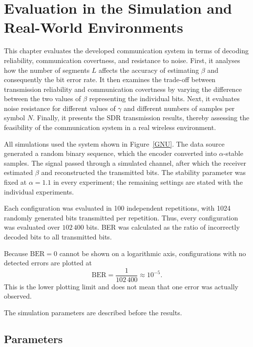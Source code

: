 \documentclass[a4paper, 12pt, openany]{book}
\begin{document}
\chapter{Evaluation in the Simulation and Real-World Environments}

This chapter evaluates the developed communication system in terms of decoding reliability, communication covertness, and resistance to noise. First, it analyses how the number of segments $L$ affects the accuracy of estimating $\beta$ and consequently the bit error rate. It then examines the trade-off between transmission reliability and communication covertness by varying the difference between the two values of $\beta$ representing the individual bits. Next, it evaluates noise resistance for different values of $\gamma$ and different numbers of samples per symbol $N$. Finally, it presents the SDR transmission results, thereby assessing the feasibility of the communication system in a real wireless environment.

All simulations used the system shown in Figure~\ref{GNU}. The data source generated a random binary sequence, which the encoder converted into $\alpha$-stable samples. The signal passed through a simulated channel, after which the receiver estimated $\beta$ and reconstructed the transmitted bits. The stability parameter was fixed at $\alpha=1.1$ in every experiment; the remaining settings are stated with the individual experiments.

Each configuration was evaluated in 100 independent repetitions, with 1024 randomly generated bits transmitted per repetition. Thus, every configuration was evaluated over $102\,400$ bits. BER was calculated as the ratio of incorrectly decoded bits to all transmitted bits.

Because $\mathrm{BER}=0$ cannot be shown on a logarithmic axis, configurations with no detected errors are plotted at
\[
\mathrm{BER}=\frac{1}{102\,400}\approx10^{-5}.
\]
This is the lower plotting limit and does not mean that one error was actually observed.

The simulation parameters are described before the results.

\clearpage
\enlargethispage{6\baselineskip}
\section{Parameters}
\end{document}
